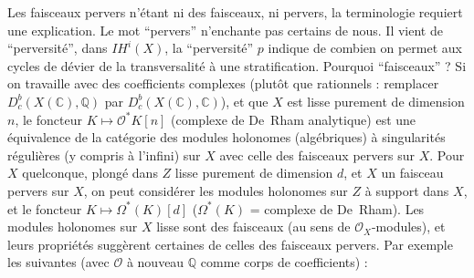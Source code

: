 \documentclass[12pt,a4paper]{article}
\theoremstyle{plain}
\theoremstyle{definition}
\theoremstyle{remark}
\newcommand{\IH}{\mathit{IH}}
\newcommand{\CC}{\mathbb{C}}
\newcommand{\QQ}{\mathbb{Q}}
\newcommand{\cO}{\mathcal{O}}
\begin{document}
Les faisceaux pervers n'étant ni des faisceaux, ni pervers, la terminologie requiert une explication. Le mot ``pervers'' n'enchante pas certains de nous. Il vient de ``perversité'', dans $\IH^{i}(X)$, la ``perversité'' $p$ indique de combien on permet aux cycles de dévier de la transversalité à une stratification. Pourquoi ``faisceaux'' ? Si on travaille avec des coefficients complexes (plutôt que rationnels : remplacer $D^{b}_{c}(X(\CC), \QQ)$ par $D^{b}_{c}(X(\CC), \CC)$), et que $X$ est lisse purement de dimension $n$, le foncteur $K \mapsto \cO^{*}K[n]$ (complexe de De~Rham analytique) est une équivalence de la catégorie des modules holonomes (algébriques) à singularités régulières (y compris à l'infini) sur $X$ avec celle des faisceaux pervers sur $X$. Pour $X$ quelconque, plongé dans $Z$ lisse purement de dimension $d$, et $X$ un faisceau pervers sur $X$, on peut considérer les modules holonomes sur $Z$ à support dans $X$, et le foncteur $K \mapsto \Omega^{*}(K)[d]$ ($\Omega^{*}(K)$ = complexe de De~Rham). Les modules holonomes sur $X$ lisse sont des faisceaux (au sens de $\cO_{X}$-modules), et leurs propriétés suggèrent certaines de celles des faisceaux pervers. Par exemple les suivantes (avec $\cO$ à nouveau $\QQ$ comme corps de coefficients) :
\end{document}
